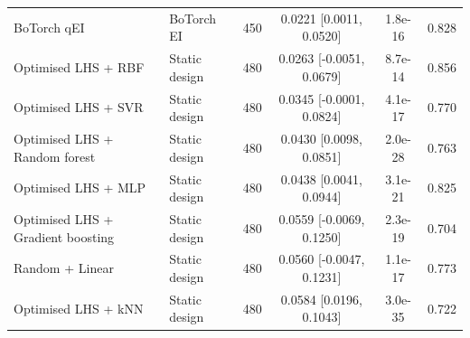 \begin{table}[htbp]
\begin{tabular}{@{}llcccc@{}}
BoTorch qEI & BoTorch EI & 450 & 0.0221 [0.0011, 0.0520] & 1.8e-16 & 0.828 \\
Optimised LHS + RBF & Static design & 480 & 0.0263 [-0.0051, 0.0679] & 8.7e-14 & 0.856 \\
Optimised LHS + SVR & Static design & 480 & 0.0345 [-0.0001, 0.0824] & 4.1e-17 & 0.770 \\
Optimised LHS + Random forest & Static design & 480 & 0.0430 [0.0098, 0.0851] & 2.0e-28 & 0.763 \\
Optimised LHS + MLP & Static design & 480 & 0.0438 [0.0041, 0.0944] & 3.1e-21 & 0.825 \\
Optimised LHS + Gradient boosting & Static design & 480 & 0.0559 [-0.0069, 0.1250] & 2.3e-19 & 0.704 \\
Random + Linear & Static design & 480 & 0.0560 [-0.0047, 0.1231] & 1.1e-17 & 0.773 \\
Optimised LHS + kNN & Static design & 480 & 0.0584 [0.0196, 0.1043] & 3.0e-35 & 0.722 \\
\bottomrule
\end{tabular}
\end{table}
